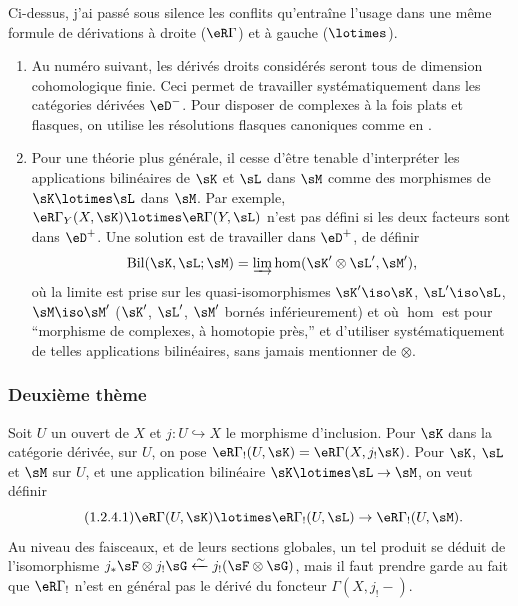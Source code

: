 \subsubsection{}\label{IV:1-2-3}

Ci-dessus, j'ai passé sous silence les conflits qu'entraîne l'usage dans une 
même formule de dérivations à droite ($\eR\Gamma$) et à gauche 
($\lotimes$). 
\begin{enumerate}[\indent a)]
  \item Au numéro suivant, les dérivés droits considérés seront tous 
    de dimension cohomologique finie. Ceci permet de travailler 
    systématiquement dans les catégories dérivées $\eD^-$. Pour disposer 
    de complexes à la fois plats et flasques, on utilise les résolutions 
    flasques canoniques comme en . 
  \item Pour une théorie plus générale, il cesse d'être tenable d'interpréter 
    les applications bilinéaires de $\sK$ et $\sL$ dans $\sM$ comme des 
    morphismes de $\sK\lotimes\sL$ dans $\sM$. Par exemple, 
    $\eR\Gamma_Y(X,\sK)\lotimes\eR\Gamma(Y,\sL)$ n'est pas défini si les deux 
    facteurs sont dans $\eD^+$. Une solution est de travailler dans $\eD^+$, de 
    définir 
    \[
      \operatorname{Bil}(\sK,\sL;\sM) = \varinjlim \hom(\sK'\otimes\sL',\sM') \text{,}
    \]
    où la limite est prise sur les quasi-isomorphismes $\sK'\iso \sK$, 
    $\sL'\iso \sL$, $\sM\iso \sM'$ ($\sK'$, $\sL'$, $\sM'$ bornés 
    inférieurement) et où $\hom$ est pour ``morphisme de complexes, à 
    homotopie près,'' et d'utiliser systématiquement de telles applications 
    bilinéaires, sans jamais mentionner de $\otimes$.  
\end{enumerate}




\subsubsection{Deuxième thème}\label{IV:1-2-4}

Soit $U$ un ouvert de $X$ et $j:U\hookrightarrow X$ le morphisme d'inclusion. 
Pour $\sK$ dans la catégorie dérivée, sur $U$, on pose 
$\eR\Gamma_!(U,\sK)=\eR\Gamma(X,j_!\sK)$. Pour $\sK$, $\sL$ et $\sM$ sur $U$, et 
une application bilinéaire $\sK\lotimes\sL\to\sM$, on veut définir 
\begin{equation*}\tag{1.2.4.1}\label{IV:eq:1-2-4-1}
  \eR\Gamma(U,\sK)\lotimes\eR\Gamma_!(U,\sL)\to\eR\Gamma_!(U,\sM) \text{.}
\end{equation*}
Au niveau des faisceaux, et de leurs sections globales, un tel produit se 
déduit de l'isomorphisme 
$j_*\sF\otimes j_!\sG\xleftarrow\sim j_!(\sF\otimes \sG)$, mais il faut prendre 
garde au fait que $\eR\Gamma_!$ n'est en général pas le dérivé du 
foncteur $\Gamma(X,j_!-)$. 

